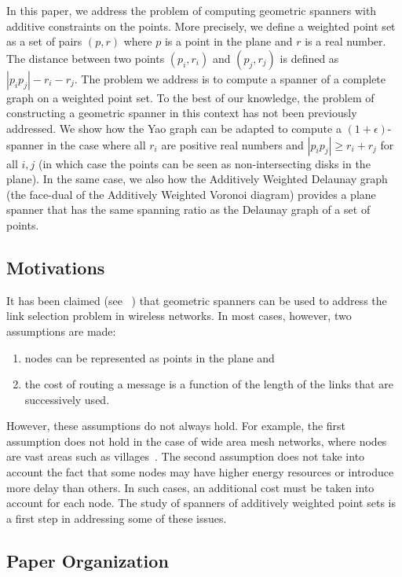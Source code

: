 \documentclass[pdftex,leqno,fleqn,12pt]{article}
\begin{document}
In this paper, we address the problem of computing geometric spanners with
additive constraints on the points. More precisely, we define a weighted
point set as a set of pairs $(p,r)$ where $p$ is a point in the plane and
$r$ is a real number. The distance between two points $(p_i,r_i)$ and
$(p_j,r_j)$ is defined as $|p_ip_j|-r_i-r_j$. The problem we address is to
compute a spanner of a complete graph on a weighted point set. To the best
of our knowledge, the problem of constructing a geometric spanner in this
context has not been previously addressed. We show how the Yao graph can be
adapted to compute a $(1+\epsilon)$-spanner in the case where all $r_i$ are
positive real numbers and $|p_ip_j|\geq r_i+r_j$ for all $i,j$ (in which
case the points can be seen as non-intersecting disks in the plane). In the
same case, we also how the Additively Weighted Delaunay graph (the face-dual
of the Additively Weighted Voronoi diagram) provides a plane spanner that
has the same spanning ratio as the Delaunay graph of a set of points.

\subsection{Motivations}

It has been claimed (see ~\cite{alzoubi03,schindelhauer04,schindelhauer07})
that geometric spanners can be used to address the link selection problem in
wireless networks. In most cases, however, two assumptions are made:
\begin{enumerate}
\item nodes can be represented as points in the plane and
\item the cost of routing a message is a function of the length of the links
that are successively used.
\end{enumerate}
However, these assumptions do
not always hold. For example, the first assumption does not hold in the case
of wide area mesh networks, where nodes are vast areas such as
villages~\cite{raman04}.  The second assumption does not take into account
the fact that some nodes may have higher energy resources or introduce more
delay than others. In such cases, an additional cost must be taken into
account for each node. The study of spanners of additively weighted
point sets is a first step in addressing some of these issues.

\subsection{Paper Organization}
\end{document}
